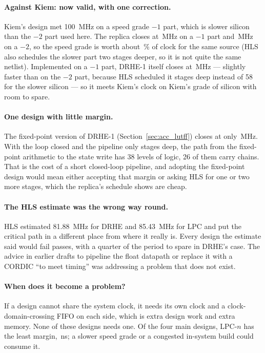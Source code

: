 \paragraph{Against Kiem: now valid, with one correction.} Kiem's design met
\SI{100}{\mega\hertz} on a speed grade $-1$ part, which is slower silicon than
the $-2$ part used here. The replica closes at \,MHz on a
$-1$ part and \,MHz on a $-2$, so the speed grade is worth about \,\% of clock for the
same source (HLS also schedules the slower part two stages deeper, so it is not
quite the same netlist). Implemented on a
$-1$ part, DRHE-1 itself closes at \,MHz --- slightly
faster than on the $-2$ part, because HLS scheduled it 
stages deep instead of 58 for the slower silicon --- so it meets Kiem's clock
on Kiem's grade of silicon with room to spare.

\paragraph{One design with little margin.} The fixed-point version of DRHE-1
(Section~\ref{sec:acc_lutff}) closes at only \,MHz. With the
loop closed and the pipeline only  stages deep, the path from
the fixed-point arithmetic to the state write has 38 levels of logic, 26 of
them carry chains. That is the cost of a short closed-loop pipeline,
and adopting the fixed-point design would mean either accepting that margin or
asking HLS for one or two more stages, which the replica's schedule shows are
cheap.

\paragraph{The HLS estimate was the wrong way round.} HLS estimated
\SI{81.88}{\mega\hertz} for DRHE and \SI{85.43}{\mega\hertz} for LPC and put
the critical path in a different place from where it really is. Every design
the estimate said would fail passes, with a quarter of the period to spare in
DRHE's case. The advice in earlier drafts to pipeline the float datapath or
replace it with a CORDIC ``to meet timing'' was addressing a problem that does
not exist.

\paragraph{When does it become a problem?} If a design cannot share the system
clock, it needs its own clock and a clock-domain-crossing FIFO on each side,
which is extra design work and extra memory. None of these designs needs one.
Of the four main designs, LPC-$n$ has the least margin, \,ns; a slower speed grade or a
congested in-system build could consume it.

